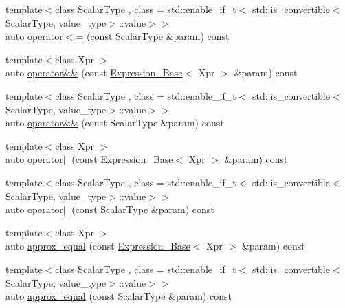 \begin{DoxyCompactItemize}
{\footnotesize template$<$class Scalar\+Type , class  = std\+::enable\+\_\+if\+\_\+t$<$   std\+::is\+\_\+convertible$<$\+Scalar\+Type, value\+\_\+type$>$\+::value$>$$>$ }\\auto \hyperlink{classbc_1_1tensors_1_1Expression__Base_aaf4129a28684c570bb02aea6c108097b}{operator$<$=} (const Scalar\+Type \&param) const
\item 
{\footnotesize template$<$class Xpr $>$ }\\auto \hyperlink{classbc_1_1tensors_1_1Expression__Base_a1c0058cc6f1c132001e4c1afb9582066}{operator\&\&} (const \hyperlink{classbc_1_1tensors_1_1Expression__Base}{Expression\+\_\+\+Base}$<$ Xpr $>$ \&param) const
\item 
{\footnotesize template$<$class Scalar\+Type , class  = std\+::enable\+\_\+if\+\_\+t$<$   std\+::is\+\_\+convertible$<$\+Scalar\+Type, value\+\_\+type$>$\+::value$>$$>$ }\\auto \hyperlink{classbc_1_1tensors_1_1Expression__Base_ace1c4e866356e784b42e4db76dd1cb04}{operator\&\&} (const Scalar\+Type \&param) const
\item 
{\footnotesize template$<$class Xpr $>$ }\\auto \hyperlink{classbc_1_1tensors_1_1Expression__Base_a336dc9c51a5a8a9a501b2c9ac23da203}{operator$\vert$$\vert$} (const \hyperlink{classbc_1_1tensors_1_1Expression__Base}{Expression\+\_\+\+Base}$<$ Xpr $>$ \&param) const
\item 
{\footnotesize template$<$class Scalar\+Type , class  = std\+::enable\+\_\+if\+\_\+t$<$   std\+::is\+\_\+convertible$<$\+Scalar\+Type, value\+\_\+type$>$\+::value$>$$>$ }\\auto \hyperlink{classbc_1_1tensors_1_1Expression__Base_adddbf56e355b10bb782f250fd5207659}{operator$\vert$$\vert$} (const Scalar\+Type \&param) const
\item 
{\footnotesize template$<$class Xpr $>$ }\\auto \hyperlink{classbc_1_1tensors_1_1Expression__Base_a50abb76e45904ee220fda2986c479faa}{approx\+\_\+equal} (const \hyperlink{classbc_1_1tensors_1_1Expression__Base}{Expression\+\_\+\+Base}$<$ Xpr $>$ \&param) const
\item 
{\footnotesize template$<$class Scalar\+Type , class  = std\+::enable\+\_\+if\+\_\+t$<$   std\+::is\+\_\+convertible$<$\+Scalar\+Type, value\+\_\+type$>$\+::value$>$$>$ }\\auto \hyperlink{classbc_1_1tensors_1_1Expression__Base_afa5557035b5b4021c14b688ac93cbe75}{approx\+\_\+equal} (const Scalar\+Type \&param) const

\end{DoxyCompactItemize}
